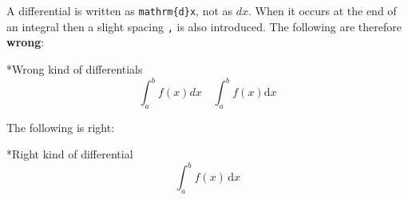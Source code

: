 A differential is written as \texttt{{\tbs}mathrm\{d\}x}, not as $dx$.
When it occurs at the end of an integral then a slight spacing \texttt{{\tbs},} is also introduced.
The following are therefore \textbf{wrong}:
\begin{showlatex}*{Wrong kind of differentials}
\[
  \int_a^b f(x) dx
  \quad
  \int_a^b f(x) \mathrm{d}x
\]
\end{showlatex}
The following is right:
\begin{showlatex}*{Right kind of differential}
\[
  \int_a^b f(x) \,\mathrm{d}x
\]
\end{showlatex}




